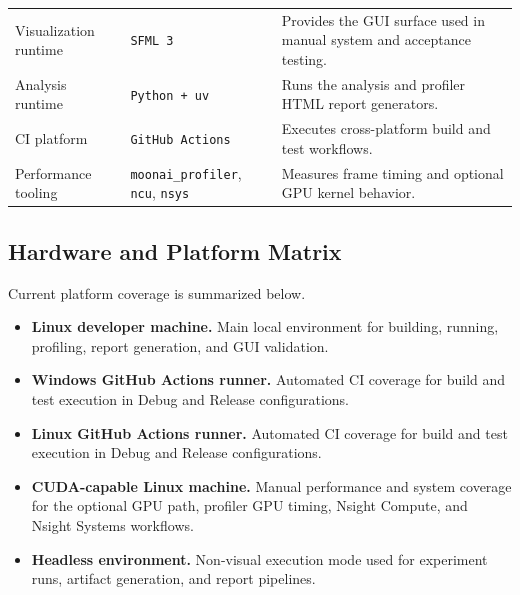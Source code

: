 \begin{table}[H]
\begin{tabularx}{\textwidth}{@{}>{\ttfamily\small}l>{\ttfamily\small}lX@{}}
		Visualization runtime  & \texttt{SFML 3}                                        & Provides the GUI surface used in manual system and acceptance testing.                               \\
		Analysis runtime       & \texttt{Python + uv}                                   & Runs the analysis and profiler HTML report generators.                                               \\
		CI platform            & \texttt{GitHub Actions}                                & Executes cross-platform build and test workflows.                                                    \\
		Performance tooling    & \texttt{moonai\_profiler}, \texttt{ncu}, \texttt{nsys} & Measures frame timing and optional GPU kernel behavior.                                              \\
		\bottomrule
	\end{tabularx}
\end{table}

\subsection{Hardware and Platform Matrix}

Current platform coverage is summarized below.

\begin{itemize}[leftmargin=*]
	\item \textbf{Linux developer machine.} Main local environment for building, running,
	      profiling, report generation, and GUI validation.

	\item \textbf{Windows GitHub Actions runner.} Automated CI coverage for build and test
	      execution in Debug and Release configurations.

	\item \textbf{Linux GitHub Actions runner.} Automated CI coverage for build and test
	      execution in Debug and Release configurations.

	\item \textbf{CUDA-capable Linux machine.} Manual performance and system coverage for
	      the optional GPU path, profiler GPU timing, Nsight Compute, and Nsight Systems workflows.

	\item \textbf{Headless environment.} Non-visual execution mode used for experiment runs,
	      artifact generation, and report pipelines.
\end{itemize}

